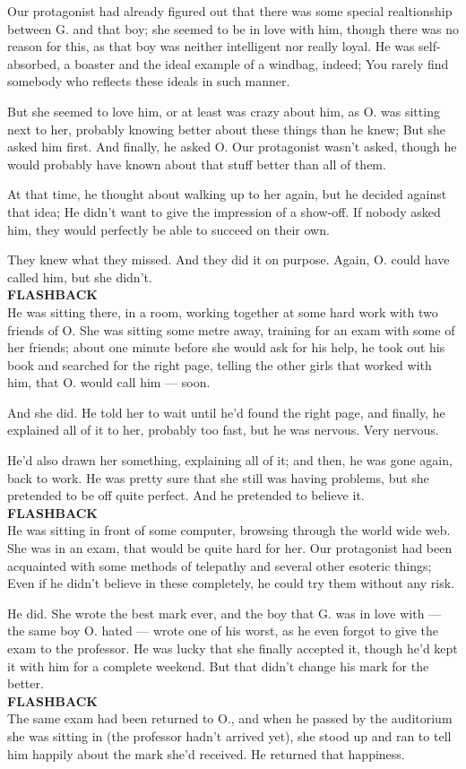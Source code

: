 Our protagonist had already figured out that there was some special realtionship between G. and that boy; she seemed to be in love with him, though there was no reason for this, as that boy was neither intelligent nor really loyal. He was self-absorbed, a boaster and the ideal example of a windbag, indeed; You rarely find somebody who reflects these ideals in such manner.

But she seemed to love him, or at least was crazy about him, as O. was sitting next to her, probably knowing better about these things than he knew; But she asked him first. And finally, he asked O. 
Our protagonist wasn't asked, though he would probably have known about that stuff better than all of them.

At that time, he thought about walking up to her again, but he decided against that idea; He didn't want to give the impression of a show-off. 
If nobody asked him, they would perfectly be able to succeed on their own.

They knew what they missed. 
And they did it on purpose. 
Again, O. could have called him, but she didn't.\\
\textbf{FLASHBACK}\\
He was sitting there, in a room, working together at some hard work with two friends of O. 
She was sitting some metre away, training for an exam with some of her friends; about one minute before she would ask for his help, he took out his book and searched for the right page, telling the other girls that worked with him, that O. would call him --- soon.

And she did. 
He told her to wait until he'd found the right page, and finally, he explained all of it to her, probably too fast, but he was nervous. 
Very nervous.

He'd also drawn her something, explaining all of it; and then, he was gone again, back to work. 
He was pretty sure that she still was having problems, but she pretended to be off quite perfect. 
And he pretended to believe it.\\
\textbf{FLASHBACK}\\
He was sitting in front of some computer, browsing through the world wide web. 
She was in an exam, that would be quite hard for her. 
Our protagonist had been acquainted with some methods of telepathy and several other esoteric things; Even if he didn't believe in these completely, he could try them without any risk.

He did. 
She wrote the best mark ever, and the boy that G. was in love with --- the same boy O. hated --- wrote one of his worst, as he even forgot to give the exam to the professor. 
He was lucky that she finally accepted it, though he'd kept it with him for a complete weekend. 
But that didn't change his mark for the better.\\
\textbf{FLASHBACK}\\
The same exam had been returned to O., and when he passed by the auditorium she was sitting in (the professor hadn't arrived yet), she stood up and ran to tell him happily about the mark she'd received. 
He returned that happiness.

